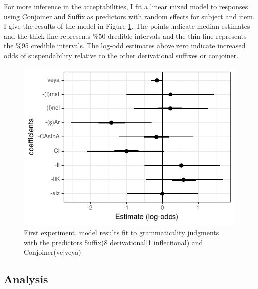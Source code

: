For more inference in the acceptabilities, I fit a linear mixed model to responses using Conjoiner and Suffix as predictors with random effects for subject and item. I give the results of the model in Figure \ref{fig:derivationalmodel}. The points indicate median estimates and the thick line represents \%50 dredible intervals and the thin line represents the \%95 credible intervals. The log-odd estimates above zero indicate increased odds of suspendability relative to the other derivational suffixes or conjoiner.

\begin{knitrout}
\color{fgcolor}\begin{figure}[hbt!]

{\centering \includegraphics[]{experiments/acceptability/report/figure/derivationalmodel-1.pdf} 

}

\caption[First experiment, model results fit to grammaticality judgments with the predictors Suffix(8 derivational|1 inflectional) and Conjoiner(ve|veya)]{First experiment, model results fit to grammaticality judgments with the predictors Suffix(8 derivational|1 inflectional) and Conjoiner(ve|veya)}\label{fig:derivationalmodel}
\end{figure}


\end{knitrout}

\subsection{Analysis}


